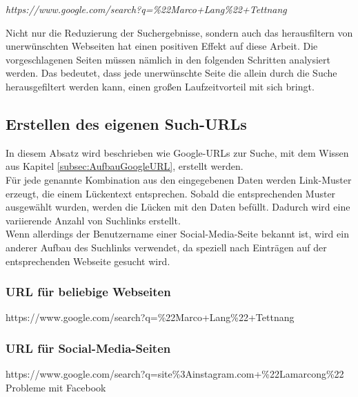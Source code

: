 			\textit{https://www.google.com/search?q=\%22Marco+Lang\%22+Tettnang}
			
			Nicht nur die Reduzierung der Suchergebnisse, sondern auch das herausfiltern von unerwünschten Webseiten hat einen positiven Effekt auf diese Arbeit. Die vorgeschlagenen Seiten müssen nämlich in den folgenden Schritten analysiert werden. Das bedeutet, dass jede unerwünschte Seite die allein durch die Suche herausgefiltert werden kann, einen großen Laufzeitvorteil mit sich bringt. 
			
		\subsection{Erstellen des eigenen Such-URLs}
		In diesem Absatz wird beschrieben wie Google-URLs zur Suche, mit dem Wissen aus Kapitel \ref{subsec:AufbauGoogleURL}, erstellt werden.\\
		Für jede genannte Kombination aus den eingegebenen Daten werden Link-Muster erzeugt, die einem Lückentext entsprechen. Sobald die entsprechenden Muster ausgewählt wurden, werden die Lücken mit den Daten befüllt. Dadurch wird eine variierende Anzahl von Suchlinks erstellt.\\
		Wenn allerdings der Benutzername einer Social-Media-Seite bekannt ist, wird ein anderer Aufbau des Suchlinks verwendet, da speziell nach Einträgen auf der entsprechenden Webseite gesucht wird.
		
			\subsubsection{URL für beliebige Webseiten}
			https://www.google.com/search?q=\%22Marco+Lang\%22+Tettnang
			\subsubsection{URL für Social-Media-Seiten}
			https://www.google.com/search?q=site\%3Ainstagram.com+\%22Lamarcong\%22
			\\Probleme mit Facebook
		
